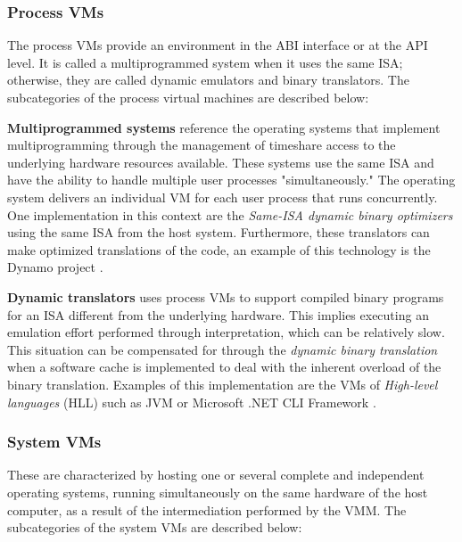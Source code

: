 
	\subsubsection{Process VMs}
	
	The process VMs provide an environment in the ABI interface or at the API level. 
	It is called a multiprogrammed system when it uses the same ISA; otherwise, they are called dynamic emulators and binary translators. 
	The subcategories of the process virtual machines are described below: 
	
	\textbf{Multiprogrammed systems} reference the operating systems that implement multiprogramming through the management of timeshare access to the underlying hardware resources available. These systems use the same ISA and have the ability to handle multiple user processes "simultaneously." The operating system delivers an individual VM for each user process that runs concurrently. One implementation in this context are the \textit{Same-ISA dynamic binary optimizers} using the same ISA from the host system. Furthermore, these translators can make optimized translations of the code, an example of this technology is the Dynamo project \cite{Bala2011}. 
	
	\textbf{Dynamic translators} uses process VMs to support compiled binary programs for an ISA different from the underlying hardware. This implies executing an emulation effort performed through interpretation, which can be relatively slow. This situation can be compensated for through the \textit{dynamic binary translation} when a software cache is implemented to deal with the inherent overload of the binary translation. Examples of this implementation are the VMs of \textit{High-level languages} (HLL)  such as JVM \cite{Lindholm1997} or Microsoft .NET CLI Framework \cite{Fisher2006} \cite{Thai2003}.

	\subsubsection{System VMs}
	
	These are characterized by hosting one or several complete and independent operating systems, running simultaneously on the same hardware of the host computer, as a result of the intermediation performed by the VMM. The subcategories of the system VMs are described below:
	
	
